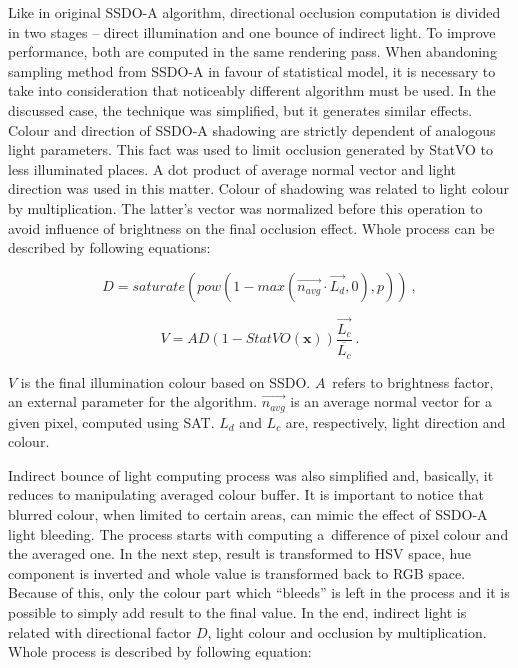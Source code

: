 \documentclass[10pt,journal,compsoc,twoside]{IEEEtran}
\begin{document}
	Like in original SSDO-A algorithm, directional occlusion computation is divided in two stages -- direct illumination and one bounce of indirect light. To improve performance, both are computed in the same rendering pass. When abandoning sampling method from SSDO-A in favour of statistical model, it is necessary to take into consideration that noticeably different algorithm must be used. In the discussed case, the technique was simplified, but it generates similar effects. Colour and direction of SSDO-A shadowing are strictly dependent of analogous light parameters. This fact was used to limit occlusion generated by StatVO to less illuminated places. A dot product of average normal vector and light direction was used in this matter. Colour of shadowing was related to light colour by multiplication. The latter's vector was normalized before this operation to avoid influence of brightness on the final occlusion effect. Whole process can be described by following equations:
	
	\begin{equation}
	D = saturate(pow(1 - max(\vec{n_{avg}} \cdot \vec{L_{d}}, 0), p))\ ,
	\end{equation}
	
	\begin{equation}
	V = AD(1 - StatVO(\mathbf{x})) \frac{\vec{L_{c}}}{\overline{L_{c}}}\ .
	\end{equation}
	
	\(V\) is the final illumination colour based on SSDO. \(A\)~refers to brightness factor, an external parameter for the algorithm. \(\vec{n_{avg}}\) is an average normal vector for a given pixel, computed using SAT. \(L_{d}\) and \(L_{c}\) are, respectively, light direction and colour.
		
	Indirect bounce of light computing process was also simplified and, basically, it reduces to manipulating averaged colour buffer. It is important to notice that blurred colour, when limited to certain areas, can mimic the effect of SSDO-A light bleeding. The process starts with computing a~difference of pixel colour and the averaged one. In the next step, result is transformed to HSV space, hue component is inverted and whole value is transformed back to RGB space. Because of this, only the colour part which ``bleeds'' is left in the process and it is possible to simply add result to the final value. In the end, indirect light is related with directional factor \(D\), light colour and occlusion by multiplication. Whole process is described by following equation:
	
\end{document}

